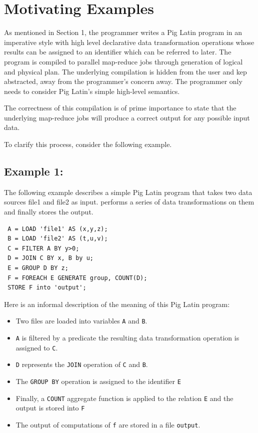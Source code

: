 \section{Motivating Examples}
\label{sec:motivation}

As mentioned in Section 1, the programmer writes a Pig Latin program in an imperative style with high level declarative data transformation operations whose results can be assigned to an identifier which can be referred to later. The program is compiled to parallel map-reduce jobs through generation of logical and physical plan. The underlying compilation is hidden from the user and kep abstracted, away from the programmer's concern away. The programmer only needs to consider Pig Latin's simple high-level semantics.

The correctness of this compilation is of prime importance to state that the underlying map-reduce jobs will produce a correct output for any possible input data.

To clarify this process, consider the following example.

\subsection{Example 1:}
\label{subsec:example1}

The following example \cite{gates2009building} describes a simple Pig Latin program that takes two data sources file1 and file2 as input. performs a series of data transformations on them and finally stores the output.
\begin{lstlisting}
 A = LOAD 'file1' AS (x,y,z);
 B = LOAD 'file2' AS (t,u,v);
 C = FILTER A BY y>0;
 D = JOIN C BY x, B by u;
 E = GROUP D BY z;
 F = FOREACH E GENERATE group, COUNT(D);
 STORE F into 'output';
\end{lstlisting}

Here is an informal description of the meaning of this Pig Latin program:

\begin{itemize}
  \item Two files are loaded into variables \texttt{A} and \texttt{B}.
  \item \texttt{A} is filtered by a predicate the resulting data transformation operation is assigned to \texttt{C}.
	\item \texttt{D} represents the \texttt{JOIN} operation of \texttt{C} and \texttt{B}.
	\item The \texttt{GROUP BY} operation is assigned to the identifier \texttt{E}
	\item Finally, a \texttt{COUNT} aggregate function is applied to the relation \texttt{E} and the output is stored into \texttt{F}
	\item The output of computations of \texttt{f} are stored in a file \texttt{output}.
\end{itemize}

